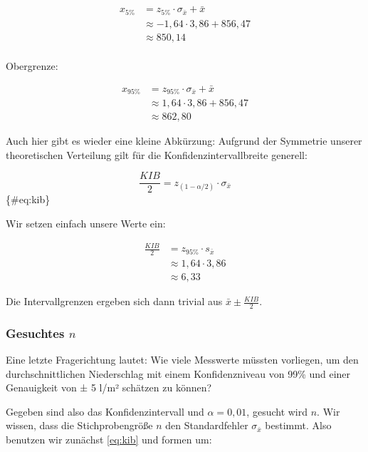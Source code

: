 \documentclass[
  ngerman,
]{article}
\begin{document}
\[\begin{aligned}
x_{5\%} &= z_{5\%} \cdot \sigma_{\bar{x}} + \bar{x}\\[4pt]
&\approx -1{,}64 \cdot 3,86 + 856{,}47\\[4pt]
&\approx 850,14\\[6pt]
\end{aligned}\]

Obergrenze:

\nopagebreak

\[\begin{aligned}
x_{95\%}&= z_{95\%} \cdot \sigma_{\bar{x}} + \bar{x}\\[4pt]
&\approx 1{,}64 \cdot 3,86 + 856{,}47\\[4pt]
&\approx 862,80
\end{aligned}\]

Auch hier gibt es wieder eine kleine Abkürzung: Aufgrund der Symmetrie unserer theoretischen Verteilung gilt für die Konfidenzintervallbreite generell:

\nopagebreak

\[
\frac{\mathit{KIB}}{2} = z_{(1-\alpha/2)} \cdot \sigma_{\bar{x}}
\]\{\#eq:kib\}

Wir setzen einfach unsere Werte ein:

\nopagebreak

\[\begin{aligned}
\frac{\mathit{KIB}}{2} &= z_{95\%} \cdot s_{\bar{x}}\\[4pt]
&\approx1{,}64 \cdot 3,86\\[4pt]
&\approx 6,33
\end{aligned}\]

Die Intervallgrenzen ergeben sich dann trivial aus \(\bar{x} \pm \frac{\mathit{KIB}}{2}\).

\hypertarget{gesuchtes-n}{%
\subsubsection{\texorpdfstring{Gesuchtes \(n\)}{Gesuchtes n}}\label{gesuchtes-n}}

Eine letzte Fragerichtung lautet: Wie viele Messwerte müssten vorliegen, um den durchschnittlichen Niederschlag mit einem Konfidenzniveau von 99\% und einer Genauigkeit von ± 5 l/m² schätzen zu können?

Gegeben sind also das Konfidenzintervall und \(\alpha=0{,}01\), gesucht wird \(n\). Wir wissen, dass die Stichprobengröße \(n\) den Standardfehler \(\sigma_{\bar{x}}\) bestimmt. Also benutzen wir zunächst \autoref{eq:kib} und formen um:
\end{document}
